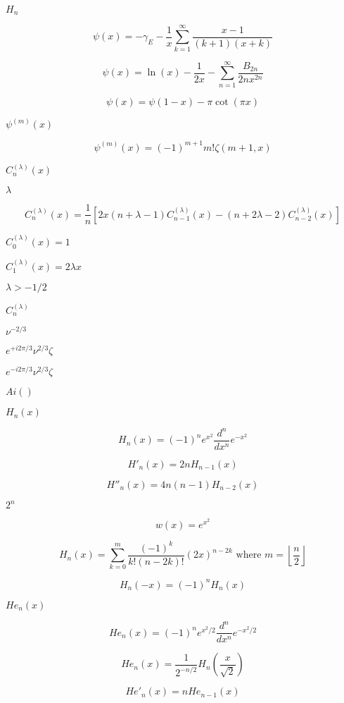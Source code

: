\documentclass{article}
\begin{document}
$ H_n $
\pagebreak

\[ \psi(x) = -\gamma_E - \frac{1}{x} \sum_{k=1}^{\infty} \frac{x - 1}{(k + 1)(x + k)} \]
\pagebreak

\[ \psi(x) = \ln(x) - \frac{1}{2x} - \sum_{n=1}^{\infty} \frac{B_{2n}}{2 n x^{2n}} \]
\pagebreak

\[ \psi(x) = \psi(1-x) - \pi \cot(\pi x) \]
\pagebreak

$ \psi^{(m)}(x) $
\pagebreak

\[ \psi^{(m)}(x) = (-1)^{m+1} m! \zeta(m+1,x) \]
\pagebreak

$ C_n^{(\lambda)}(x) $
\pagebreak

$ \lambda $
\pagebreak

\[ C_n^{(\lambda)}(x) = \frac{1}{n}\left[ 2x(n+\lambda-1)C_{n-1}^{(\lambda)}(x) - (n + 2\lambda-2)C_{n-2}^{(\lambda)}(x) \right] \]
\pagebreak

$ C_0^{(\lambda)}(x) = 1 $
\pagebreak

$ C_1^{(\lambda)}(x) = 2\lambda x $
\pagebreak

$ \lambda > -1/2 $
\pagebreak

$ C_n^{(\lambda)}$
\pagebreak

$ \nu^{-2/3} $
\pagebreak

$ e^{+i2\pi/3} \nu^{2/3} \zeta $
\pagebreak

$ e^{-i2\pi/3} \nu^{2/3} \zeta $
\pagebreak

$ Ai() $
\pagebreak

$ H_n(x) $
\pagebreak

\[ H_n(x) = (-1)^n e^{x^2} \frac{d^n}{dx^n} e^{-x^2} \]
\pagebreak

\[ H'_n(x) = 2n H_{n-1}(x) \]
\pagebreak

\[ H''_n(x) = 4n(n - 1) H_{n-2}(x) \]
\pagebreak

$ 2^n $
\pagebreak

\[ w(x) = e^{x^2} \]
\pagebreak

\[ H_n(x) = \sum_{k=0}^{m} \frac{(-1)^k}{k!(n-2k)!}(2x)^{n-2k} \mbox{ where } m = \left\lfloor{\frac{n}{2}}\right\rfloor \]
\pagebreak

\[ H_n(-x) = (-1)^n H_n(x) \]
\pagebreak

$ He_n(x) $
\pagebreak

\[ He_n(x) = (-1)^n e^{x^2/2} \frac{d^n}{dx^n} e^{-x^2/2} \]
\pagebreak

\[ He_n(x) = \frac{1}{2^{-n/2}}H_n\left(\frac{x}{\sqrt{2}}\right) \]
\pagebreak

\[ He'_n(x) = n He_{n-1}(x) \]
\pagebreak
\end{document}
